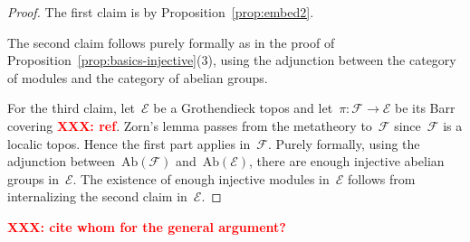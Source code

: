 \documentclass[oneside]{amsart}
\theoremstyle{definition}
\theoremstyle{plain}
\theoremstyle{remark}
\newcommand{\XXX}[1]{\textbf{\textcolor{red}{XXX: #1}}}
\newcommand{\E}{\mathcal{E}}
\newcommand{\F}{\mathcal{F}}
\renewcommand{\_}{\mathpunct{.}\,}
\begin{document}
\begin{proof}The first claim is by Proposition~\ref{prop:embed2}.

The second claim follows purely formally as in the proof of
Proposition~\ref{prop:basics-injective}(3), using the adjunction between the
category of modules and the category of abelian groups.

For the third claim, let~$\E$ be a Grothendieck topos and let~$\pi : \F \to \E$ be its Barr
covering \XXX{ref}. Zorn's lemma passes from the metatheory to~$\F$ since~$\F$ is a
localic topos. Hence the first part applies in~$\F$. Purely formally, using the
adjunction between~$\mathrm{Ab}(\F)$ and~$\mathrm{Ab}(\E)$, there are enough
injective abelian groups in~$\E$. The existence of enough injective modules
in~$\E$ follows from internalizing the second claim in~$\E$.
\end{proof}

\XXX{cite whom for the general argument?}
\end{document}
